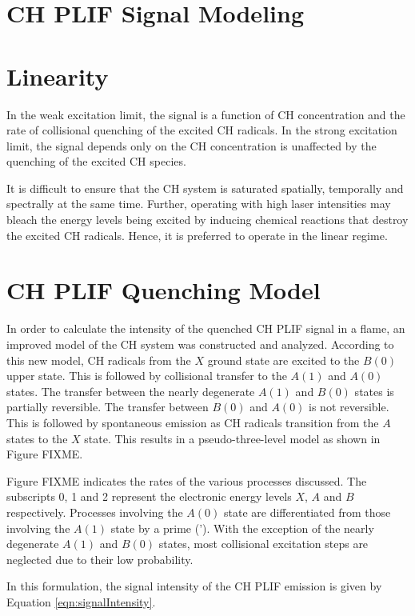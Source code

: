 \section{CH PLIF Signal Modeling}

\section{Linearity}

In the weak excitation limit, the signal is a function of CH concentration and the rate of collisional quenching of the excited CH radicals.
In the strong excitation limit, the signal depends only on the CH concentration is unaffected by the quenching of the excited CH species.

It is difficult to ensure that the CH system is saturated spatially, temporally and spectrally at the same time.
Further, operating with high laser intensities may bleach the energy levels being excited by inducing chemical reactions that destroy the excited CH radicals.
Hence, it is preferred to operate in the linear regime.

\section{CH PLIF Quenching Model}
\label{sec:quenchingmodel}


In order to calculate the intensity of the quenched CH PLIF signal in a flame, an improved model of the CH system was constructed and analyzed.
According to this new model, CH radicals from the \(X\) ground state are excited to the \(B(0)\) upper state.
This is followed by collisional transfer to the \(A(1)\) and \(A(0)\) states.
The transfer between the nearly degenerate \(A(1)\) and \(B(0)\) states is partially reversible.
The transfer between \(B(0)\) and \(A(0)\) is not reversible.
This is followed by spontaneous emission as CH radicals transition from the \(A\) states to the \(X\) state.
This results in a pseudo-three-level model as shown in Figure FIXME.

Figure FIXME indicates the rates of the various processes discussed.
The subscripts 0, 1 and 2 represent the electronic energy levels \(X\), \(A\) and \(B\) respectively.
Processes involving the \(A(0)\) state are differentiated from those involving the \(A(1)\) state by a prime (').
With the exception of the nearly degenerate \(A(1)\) and \(B(0)\) states, most collisional excitation steps are neglected due to their low probability.

In this formulation, the signal intensity of the CH PLIF emission is given by Equation \ref{eqn:signalIntensity}.

